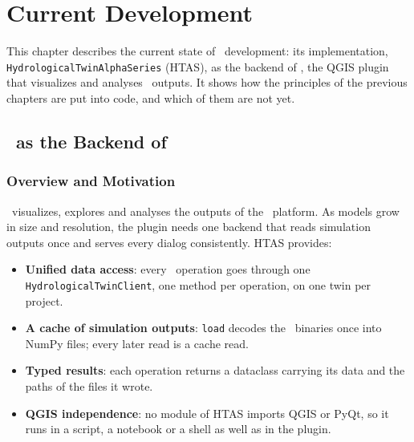 \chapter{Current Development} \label{chap-current-dev}

\fancyhead[LE]{\thepage}
\fancyhead[RO]{\thepage}
\renewcommand{\headrulewidth}{1pt}

\setlength{\parindent}{0cm}
\setlength{\parskip}{9pt}


This chapter describes the current state of \hydrot\ development: its
implementation, \texttt{HydrologicalTwinAlphaSeries} (HTAS), as the backend of
\cwv, the QGIS plugin that visualizes and analyses \cw\ outputs. It shows how
the principles of the previous chapters are put into code, and which of them
are not yet.


\section{\hydrot\ as the Backend of \cwv}

\subsection{Overview and Motivation}

\cwv\ visualizes, explores and analyses the outputs of the \cw\ platform. As
models grow in size and resolution, the plugin needs one backend that reads
simulation outputs once and serves every dialog consistently. HTAS provides:

\begin{itemize}
    \item \textbf{Unified data access}: every \cwv\ operation goes through one \texttt{HydrologicalTwinClient}, one method per operation, on one twin per project.
    \item \textbf{A cache of simulation outputs}: \texttt{load} decodes the \cw\ binaries once into NumPy files; every later read is a cache read.
    \item \textbf{Typed results}: each operation returns a dataclass carrying its data and the paths of the files it wrote.
    \item \textbf{QGIS independence}: no module of HTAS imports QGIS or PyQt, so it runs in a script, a notebook or a shell as well as in the plugin.
\end{itemize}

